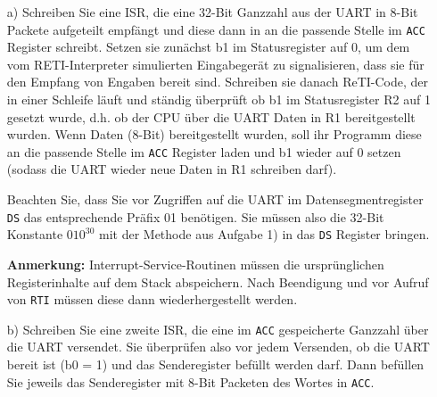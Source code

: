 \documentclass{article}
\begin{document}
\begin{itemize}
\item[a)]
Schreiben Sie eine ISR, die eine 32-Bit Ganzzahl aus der UART in 8-Bit Packete aufgeteilt empfängt und diese dann in an die passende Stelle im \texttt{ACC} Register schreibt. Setzen sie zunächst b1 im Statusregister auf 0, um dem vom RETI-Interpreter simulierten Eingabegerät zu signalisieren, dass sie für den Empfang von Engaben bereit sind. Schreiben sie danach ReTI-Code, der in einer Schleife läuft und ständig überprüft ob b1 im Statusregister R2 auf 1 gesetzt wurde, d.h. ob der CPU über die UART Daten in R1 bereitgestellt wurden. Wenn Daten (8-Bit) bereitgestellt wurden, soll ihr Programm diese an die passende Stelle im \texttt{ACC} Register laden und b1 wieder auf 0 setzen (sodass die UART wieder neue Daten in R1 schreiben darf).

Beachten Sie, dass Sie vor Zugriffen auf die UART im Datensegmentregister \texttt{DS} das entsprechende Präfix 01 benötigen. Sie müssen also die 32-Bit Konstante $010^{30}$ mit der Methode aus Aufgabe 1) in das \texttt{DS} Register bringen.

\textbf{Anmerkung:} Interrupt-Service-Routinen müssen die ursprünglichen Registerinhalte auf dem Stack abspeichern. Nach Beendigung und vor Aufruf von \texttt{RTI} müssen diese dann wiederhergestellt werden.

\item[b)]
Schreiben Sie eine zweite ISR, die eine im \texttt{ACC} gespeicherte Ganzzahl über die UART versendet.
Sie überprüfen also vor jedem Versenden, ob die UART bereit ist (b0 = 1) und das Senderegister befüllt werden darf.
Dann befüllen Sie jeweils das Senderegister mit 8-Bit Packeten des Wortes in \texttt{ACC}.
\end{itemize}
\end{document}
